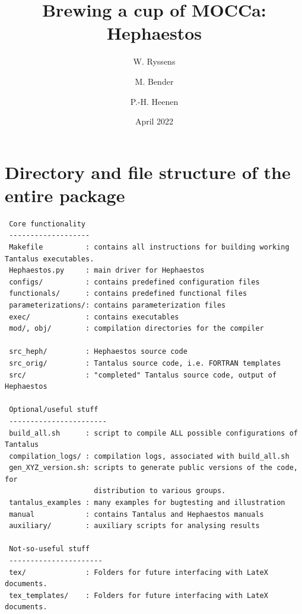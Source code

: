 \documentclass[print,amsmath,amssymb,aps,prc,nofootinbib,notitlepage]{revtex4-1}
\begin{document}
\author{W. Ryssens}


\author{M. Bender}
\author{P.-H. Heenen}
    
\date{April 2022}
\title{Brewing a cup of MOCCa: Hephaestos}


\maketitle

\setlength{\parindent}{0pt}

\section{Directory and file structure of the entire package}


\begin{Verbatim}
 Core functionality
 -------------------
 Makefile          : contains all instructions for building working Tantalus executables.
 Hephaestos.py     : main driver for Hephaestos
 configs/          : contains predefined configuration files
 functionals/      : contains predefined functional files
 parameterizations/: contains parameterization files
 exec/             : contains executables
 mod/, obj/        : compilation directories for the compiler

 src_heph/         : Hephaestos source code
 src_orig/         : Tantalus source code, i.e. FORTRAN templates
 src/              : "completed" Tantalus source code, output of Hephaestos

 Optional/useful stuff
 -----------------------
 build_all.sh      : script to compile ALL possible configurations of Tantalus
 compilation_logs/ : compilation logs, associated with build_all.sh
 gen_XYZ_version.sh: scripts to generate public versions of the code, for 
                     distribution to various groups. 
 tantalus_examples : many examples for bugtesting and illustration
 manual            : contains Tantalus and Hephaestos manuals
 auxiliary/        : auxiliary scripts for analysing results
 
 Not-so-useful stuff
 ----------------------   
 tex/              : Folders for future interfacing with LateX documents. 
 tex_templates/    : Folders for future interfacing with LateX documents.

\end{Verbatim}
\end{document}
